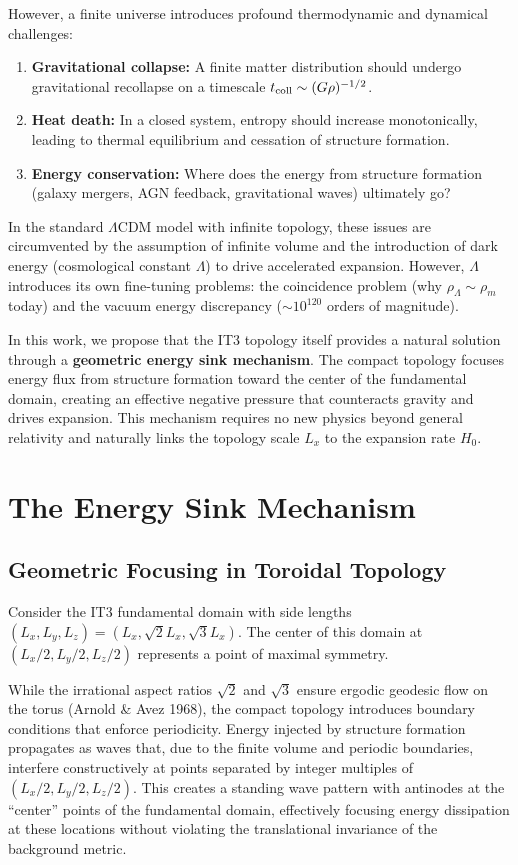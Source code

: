 \documentclass[12pt,a4paper]{article}
\begin{document}
However, a finite universe introduces profound thermodynamic and dynamical challenges:
\begin{enumerate}
    \item \textbf{Gravitational collapse:} A finite matter distribution should undergo gravitational recollapse on a timescale $t_{\rm coll} \sim (G\rho)^{-1/2}$.
    \item \textbf{Heat death:} In a closed system, entropy should increase monotonically, leading to thermal equilibrium and cessation of structure formation.
    \item \textbf{Energy conservation:} Where does the energy from structure formation (galaxy mergers, AGN feedback, gravitational waves) ultimately go?
\end{enumerate}

In the standard $\Lambda$CDM model with infinite topology, these issues are circumvented by the assumption of infinite volume and the introduction of dark energy (cosmological constant $\Lambda$) to drive accelerated expansion. However, $\Lambda$ introduces its own fine-tuning problems: the coincidence problem (why $\rho_\Lambda \sim \rho_m$ today) and the vacuum energy discrepancy ($\sim 10^{120}$ orders of magnitude).

In this work, we propose that the IT3 topology itself provides a natural solution through a \textbf{geometric energy sink mechanism}. The compact topology focuses energy flux from structure formation toward the center of the fundamental domain, creating an effective negative pressure that counteracts gravity and drives expansion. This mechanism requires no new physics beyond general relativity and naturally links the topology scale $L_x$ to the expansion rate $H_0$.

\section{The Energy Sink Mechanism}

\subsection{Geometric Focusing in Toroidal Topology}

Consider the IT3 fundamental domain with side lengths $(L_x, L_y, L_z) = (L_x, \sqrt{2}L_x, \sqrt{3}L_x)$. The center of this domain at $(L_x/2, L_y/2, L_z/2)$ represents a point of maximal symmetry.

While the irrational aspect ratios $\sqrt{2}$ and $\sqrt{3}$ ensure ergodic geodesic flow on the torus (Arnold \& Avez 1968), the compact topology introduces boundary conditions that enforce periodicity. Energy injected by structure formation propagates as waves that, due to the finite volume and periodic boundaries, interfere constructively at points separated by integer multiples of $(L_x/2, L_y/2, L_z/2)$. This creates a standing wave pattern with antinodes at the ``center'' points of the fundamental domain, effectively focusing energy dissipation at these locations without violating the translational invariance of the background metric.
\end{document}
